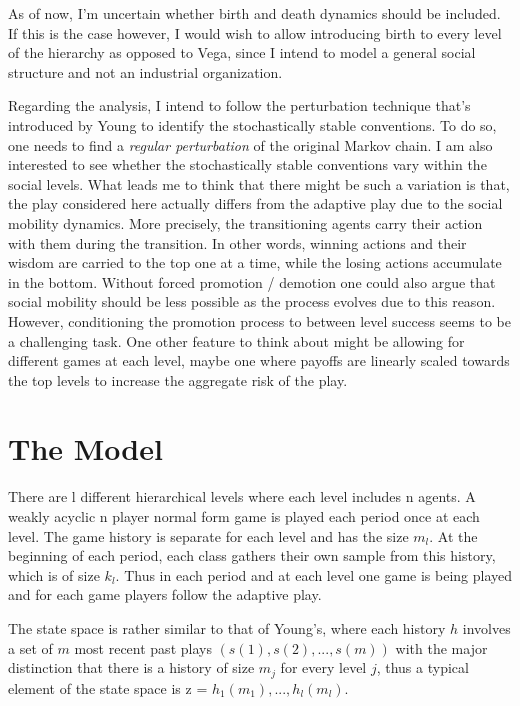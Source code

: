 \documentclass[11pt, a4paper, leqno]{article}
\begin{document}
As of now, I'm uncertain whether birth and death dynamics should be included. If this is the case however, I would wish to allow introducing birth to every level of the hierarchy as opposed to Vega, since I intend to model a general social structure and not an industrial organization.

Regarding the analysis, I intend to follow the perturbation technique that's introduced by Young to identify the stochastically stable conventions. To do so, one needs to find a \textit{regular perturbation} of the original Markov chain. I am also interested to see whether the stochastically stable conventions vary within the social levels. What leads me to think that there might be such a variation is that, the play considered here actually differs from the adaptive play due to the social mobility dynamics. More precisely, the transitioning agents   carry their action with them during the transition. In other words, winning actions and their wisdom are carried to the top one at a time, while the losing actions accumulate in the bottom. Without forced promotion / demotion one could also argue that social mobility should be less possible as the process evolves due to this reason. However, conditioning the promotion process to between level success seems to be a challenging task. One other feature to think about might be allowing for different games at each level, maybe one where payoffs are linearly scaled towards the top levels to increase the aggregate risk of the play.




\section*{The Model}
There are l different hierarchical levels where each level includes n agents. A weakly acyclic n player normal form game is played each period once at each level. The game history is separate for each level and has the size $m_l$. At the beginning of each period, each class gathers their own sample from this history, which is of size $k_l$. Thus in each period and at each level one game is being played and for each game players follow the adaptive play. 

The state space is rather similar to that of Young's, where each history $h$ involves a set of $m$ most recent past plays $(s(1), s(2),...,s(m))$ with the major distinction that there is a history of size $m_j$ for every level $j$, thus a typical element of the state space is z = $h_1(m_1),...,h_l(m_l)$. 
\end{document}
